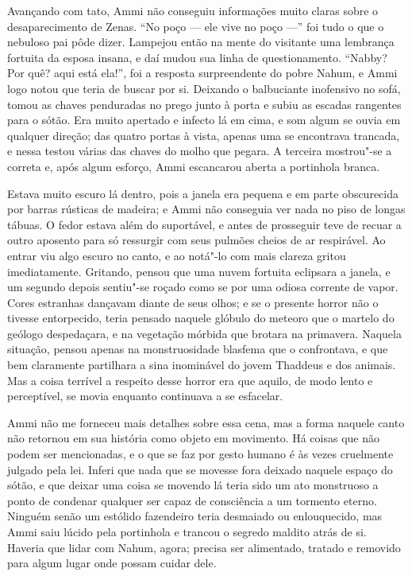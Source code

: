 Avançando com tato, Ammi não conseguiu informações muito claras sobre o
desaparecimento de Zenas. ``No poço --- ele vive no poço ---'' foi tudo
o que o nebuloso pai pôde dizer. Lampejou então na mente do visitante
uma lembrança fortuita da esposa insana, e daí mudou sua linha de
questionamento. ``Nabby? Por quê? aqui está ela!'', foi a resposta
surpreendente do pobre Nahum, e Ammi logo notou que teria de buscar por
si. Deixando o balbuciante inofensivo no sofá, tomou as chaves
penduradas no prego junto à porta e subiu as escadas rangentes para o
sótão. Era muito apertado e infecto lá em cima, e som algum se ouvia em
qualquer direção; das quatro portas à vista, apenas uma se encontrava
trancada, e nessa testou várias das chaves do molho que pegara. A
terceira mostrou"-se a correta e, após algum esforço, Ammi escancarou
aberta a portinhola branca.

Estava muito escuro lá dentro, pois a janela era pequena e em parte
obscurecida por barras rústicas de madeira; e Ammi não conseguia ver
nada no piso de longas tábuas. O fedor estava além do suportável, e
antes de prosseguir teve de recuar a outro aposento para só ressurgir
com seus pulmões cheios de ar respirável. Ao entrar viu algo escuro no
canto, e ao notá"-lo com mais clareza gritou imediatamente. Gritando,
pensou que uma nuvem fortuita eclipsara a janela, e um segundo depois
sentiu"-se roçado como se por uma odiosa corrente de vapor. Cores
estranhas dançavam diante de seus olhos; e se o presente horror não o
tivesse entorpecido, teria pensado naquele glóbulo do meteoro que o
martelo do geólogo despedaçara, e na vegetação mórbida que brotara na
primavera. Naquela situação, pensou apenas na monstruosidade blasfema
que o confrontava, e que bem claramente partilhara a sina inominável do
jovem Thaddeus e dos animais. Mas a coisa terrível a respeito desse
horror era que aquilo, de modo lento e perceptível, se movia enquanto
continuava a se esfacelar.

Ammi não me forneceu mais detalhes sobre essa cena, mas a forma naquele
canto não retornou em sua história como objeto em movimento. Há coisas
que não podem ser mencionadas, e o que se faz por gesto humano é às
vezes cruelmente julgado pela lei. Inferi que nada que se movesse fora
deixado naquele espaço do sótão, e que deixar uma coisa se movendo lá
teria sido um ato monstruoso a ponto de condenar qualquer ser capaz de
consciência a um tormento eterno. Ninguém senão um estólido fazendeiro
teria desmaiado ou enlouquecido, mas Ammi saiu lúcido pela portinhola e
trancou o segredo maldito atrás de si. Haveria que lidar com Nahum,
agora; precisa ser alimentado, tratado e removido para algum lugar onde
possam cuidar dele.

